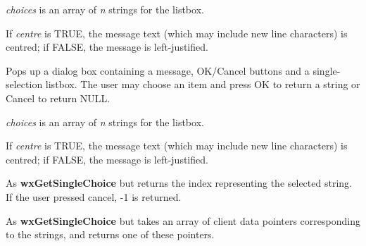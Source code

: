 {\it choices} is an array of {\it n} strings for the listbox.

If {\it centre} is TRUE, the message text (which may include new line characters)
is centred; if FALSE, the message is left-justified.

\label{wxgetsinglechoice}


Pops up a dialog box containing a message, OK/Cancel buttons and a single-selection
listbox. The user may choose an item and press OK to return a string or
Cancel to return NULL.

{\it choices} is an array of {\it n} strings for the listbox.

If {\it centre} is TRUE, the message text (which may include new line characters)
is centred; if FALSE, the message is left-justified.

\label{wxgetsinglechoiceindex}


As {\bf wxGetSingleChoice} but returns the index representing the selected string.
If the user pressed cancel, -1 is returned.

\label{wxgetsinglechoicedata}


As {\bf wxGetSingleChoice} but takes an array of client data pointers
corresponding to the strings, and returns one of these pointers.

